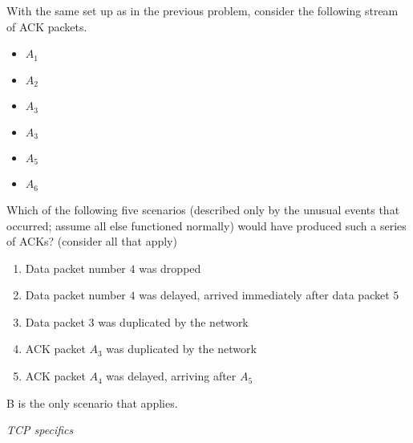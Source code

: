 \documentclass{supervision}
\begin{document}
\begin{questions}
\begin{parts}
\begin{subparts}
            \subpart With the same set up as in the previous problem,
              consider the following stream of ACK packets.

              \begin{itemize}
                \item $A_1$
                \item $A_2$
                \item $A_3$
                \item $A_3$
                \item $A_5$
                \item $A_6$
              \end{itemize}

              Which of the following five scenarios (described only by the
              unusual events that occurred; assume all else functioned
              normally) would have produced such a series of ACKs? (consider
              all that apply)

              \begin{enumerate}[label=(\alph*)]
                \item Data packet number $4$ was dropped
                \item Data packet number $4$ was delayed, arrived immediately
                after data packet $5$
                \item Data packet $3$ was duplicated by the network
                \item ACK packet $A_3$ was duplicated by the network
                \item ACK packet $A_4$ was delayed, arriving after $A_5$
              \end{enumerate}
              \begin{solution}
                B is the only scenario that applies.
              \end{solution}
          \end{subparts}
      \end{parts}

    \question \textit{TCP specifics}
\end{questions}
\end{document}
